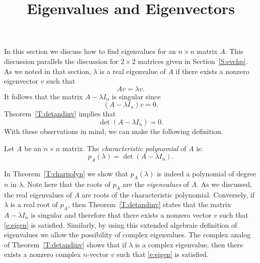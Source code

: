 \documentclass{ximera}
\title{Eigenvalues and Eigenvectors}
\begin{document}
\begin{abstract}
\end{abstract}
\maketitle

 \label{S:eig} 
 
In this section we discuss how to find eigenvalues for an
$n\times n$ matrix $A$.  This discussion parallels the
discussion for $2\times 2$ matrices given in
Section~\ref{S:evchp}.  As we noted in that section, $\lambda$
is a real eigenvalue of $A$ if there exists a nonzero
eigenvector $v$ such that
\begin{equation}  \label{e:eigen}
Av = \lambda v.
\end{equation}
It follows that the matrix $A-\lambda I_n$ is 
singular since
\[
(A-\lambda I_n)v = 0.
\]
Theorem~\ref{T:detandinv} implies that 
\[
\det(A-\lambda I_n) = 0.
\]
With these observations in mind, we can make the following definition.
\begin{definition}   \label{D:charpoly}
Let $A$ be an $n\times n$ matrix.  The {\em characteristic polynomial\/} 
of $A$ is:
\[
p_A(\lambda) = \det(A-\lambda I_n).
\]  
\end{definition}

In Theorem~\ref{T:charpolyn} we show that $p_A(\lambda)$ is indeed a 
polynomial of degree $n$ in $\lambda$.  Note here that the roots of 
$p_A$ are the {\em eigenvalues\/} of $A$. As we
discussed, the real eigenvalues 
of $A$ are roots of the
characteristic polynomial.   Conversely, if
$\lambda$ is a real root of $p_A$, then
Theorem~\ref{T:detandinv} states that the matrix $A-\lambda I_n$
is singular and therefore that there exists a nonzero vector $v$
such that \eqref{e:eigen} is satisfied.  Similarly, by using this
extended algebraic definition of eigenvalues we allow the
possibility of complex eigenvalues.  
The complex analog of
Theorem~\ref{T:detandinv} shows that if $\lambda$ is a complex
eigenvalue, then there exists a nonzero complex $n$-vector $v$
such that \eqref{e:eigen} is satisfied.
\end{document}
